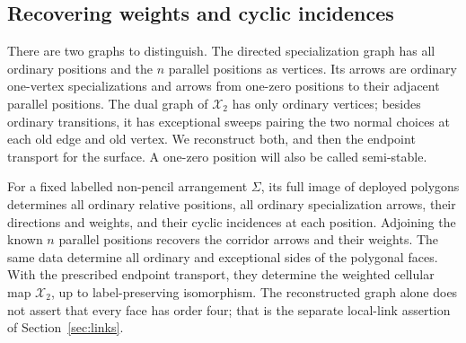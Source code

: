 \subsection{Recovering weights and cyclic incidences}
There are two graphs to distinguish. The directed specialization
graph has all ordinary positions and the $n$ parallel positions as
vertices. Its arrows are ordinary one-vertex specializations and
arrows from one-zero positions to their adjacent parallel positions.
The dual graph of $\mathcal X_2$ has only ordinary vertices; besides
ordinary transitions, it has exceptional sweeps pairing the two
normal choices at each old edge and old vertex. We reconstruct both,
and then the endpoint transport for the surface. A one-zero position
will also be called semi-stable.

\begin{proposition}\label{prop:polygon-reconstruction}

For a fixed labelled non-pencil arrangement $\Sigma$, its full image of
deployed polygons determines all ordinary relative positions,
all ordinary specialization arrows, their directions and weights, and
their cyclic incidences at each position.  Adjoining the known $n$
parallel positions recovers the corridor arrows and their
weights.  The same data determine all ordinary and exceptional sides of the
polygonal faces. With the prescribed endpoint transport, they determine
the weighted cellular map $\mathcal X_2$, up to label-preserving
isomorphism.
The reconstructed graph alone does not assert that every face has
order four; that is the separate local-link assertion of Section~\ref{sec:links}.
\end{proposition}
